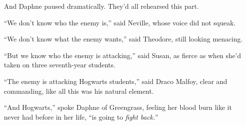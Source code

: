 And Daphne paused dramatically. They’d all rehearsed this part.

“We don’t know who the enemy is,” said Neville, whose voice did not squeak.

“We don’t know what the enemy wants,” said Theodore, still looking menacing.

“But we know who the enemy is attacking,” said Susan, as fierce as when she’d taken on three seventh-year students.

“The enemy is attacking Hogwarts students,” said Draco Malfoy, clear and commanding, like all this was his natural element.

“And Hogwarts,” spoke Daphne of Greengrass, feeling her blood burn like it never had before in her life, “is going to \emph{fight back.}”


